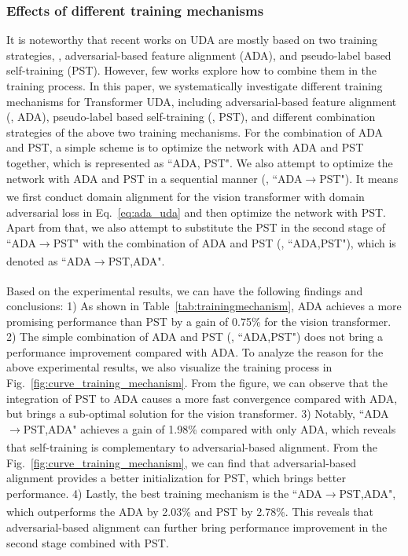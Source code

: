 \documentclass[journal]{IEEEtran}
\begin{document}
\subsubsection{Effects of different training mechanisms}
It is noteworthy that recent works on UDA are mostly  based on two training strategies, \ieno, adversarial-based feature alignment (ADA), and pseudo-label based self-training (PST). However, few works explore how to combine them in the training process. In this paper, we systematically investigate different training mechanisms for Transformer UDA, including adversarial-based feature alignment (\ieno, ADA), pseudo-label based self-training (\ieno, PST), and different combination 
strategies of the above two training mechanisms. For the combination of ADA and PST, a simple scheme is to optimize the network with ADA and PST together, which is represented as ``ADA, PST". We also attempt to optimize the network with ADA and PST in a sequential manner (\ieno, ``ADA$\xrightarrow[]{}$PST"). It means we first conduct domain alignment for the vision transformer with domain adversarial loss in Eq.~\ref{eq:ada_uda} and then optimize the network with PST. Apart from that, we also attempt to substitute the PST in the second stage of ``ADA$\xrightarrow[]{}$PST" with the combination of ADA and PST (\ieno, ``ADA,PST"), which is denoted as ``ADA$\xrightarrow[]{}$PST,ADA".


Based on the experimental results, we can have the following findings and conclusions:
1) As shown in Table~\ref{tab:trainingmechanism}, ADA achieves a more promising performance than PST by a gain of 0.75\% for the vision transformer. 2) The simple combination of ADA and PST (\ieno,  ``ADA,PST") does not bring a performance improvement compared with ADA. To analyze the reason for the above experimental results, we also visualize the training process in Fig.~\ref{fig:curve_training_mechanism}. From the figure, we can observe that the integration of PST to ADA causes a more fast convergence compared with ADA, but brings a sub-optimal solution for the vision transformer. 3) Notably, ``ADA$\xrightarrow[]{}$PST,ADA" achieves a gain of 1.98\% compared with only ADA, which reveals that self-training is complementary to adversarial-based alignment. From the Fig.~\ref{fig:curve_training_mechanism}, we can find that adversarial-based alignment provides a better initialization for PST, which brings better performance. 4) Lastly, the best training mechanism is the ``ADA$\xrightarrow[]{}$PST,ADA", which outperforms the ADA by 2.03\% and PST by 2.78\%. This reveals that adversarial-based alignment can further bring performance improvement in the second stage combined with PST.   
\end{document}
